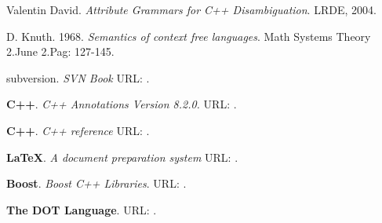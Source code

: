 \begin{thebibliography}{10}
 Valentin David. \textit{Attribute Grammars for C++ Disambiguation}. LRDE, 2004.

 D. Knuth. 1968. \textit{Semantics of context free languages}. Math Systems Theory 2.June 2.Pag: 127-145.

 subversion. \textit{SVN Book} URL: .
% 
% 

 \textbf{C++}. \textit{C++ Annotations Version 8.2.0.} URL: . 

 \textbf{C++}. \textit{C++ reference} URL: . 

 \textbf{\LaTeX}. \textit{A document preparation system} URL: .

 \textbf{Boost}. \textit{Boost C++ Libraries}. URL: . 

 \textbf{The DOT Language}. URL: .
 
\end{thebibliography}